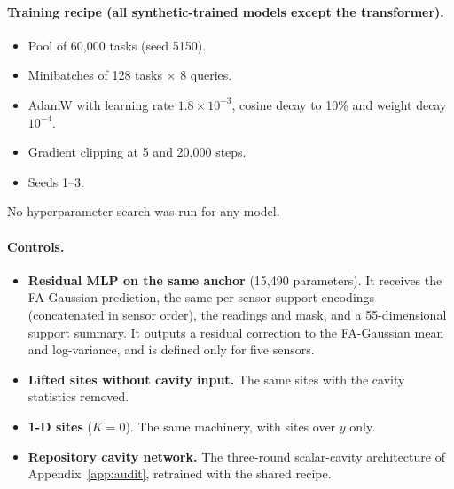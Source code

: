 

\paragraph{Training recipe (all synthetic-trained models except the transformer).}
\begin{itemize}
  \item Pool of 60{,}000 tasks (seed 5150).
  \item Minibatches of 128 tasks $\times$ 8 queries.
  \item AdamW with learning rate $1.8\times10^{-3}$, cosine decay to 10\% and weight decay $10^{-4}$.
  \item Gradient clipping at 5 and 20{,}000 steps.
  \item Seeds 1--3.
\end{itemize}
No hyperparameter search was run for any model.

\paragraph{Controls.}
\begin{itemize}
  \item \textbf{Residual MLP on the same anchor} (15{,}490 parameters). It receives the FA-Gaussian prediction, the
  same per-sensor support encodings (concatenated in sensor order), the readings and mask, and a 55-dimensional
  support summary. It outputs a residual correction to the FA-Gaussian mean and log-variance, and is defined only
  for five sensors.
  \item \textbf{Lifted sites without cavity input.} The same sites with the cavity statistics removed.
  \item \textbf{1-D sites} ($K=0$). The same machinery, with sites over $y$ only.
  \item \textbf{Repository cavity network.} The three-round scalar-cavity architecture of
  Appendix~\ref{app:audit}, retrained with the shared recipe.
\end{itemize}

